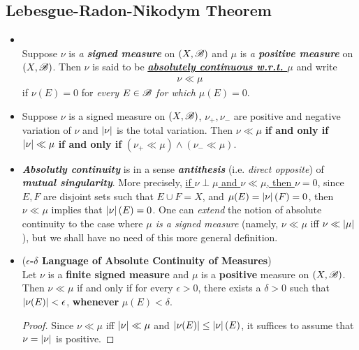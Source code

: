 \documentclass[11pt]{article}
\begin{document}
\subsection{Lebesgue-Radon-Nikodym Theorem}
\begin{itemize}
\item \begin{definition}\citep{folland2013real}\\
Suppose $\nu$ is \emph{a \textbf{signed measure}} on $(X,{\mathscr B})$ and $\mu$ is \emph{a \textbf{positive measure}} on $(X,{\mathscr B})$. Then $\nu$ is said to be \underline{\emph{\textbf{absolutely continuous w.r.t. $\mu$}}} and write
\begin{align*}
\nu \ll \mu 
\end{align*}
if $\nu(E)=0$ for \emph{every $E\in {\mathscr B}$ for which $\mu(E)=0$}. 
\end{definition}

\item
\begin{proposition}
Suppose $\nu$ is a signed measure on $(X,{\mathscr B})$,  $ \nu_{+}, \nu_{-}$ are positive and negative variation of $\nu$ and $\left\lvert \nu \right\rvert$ is the total variation. Then 
$\nu \ll \mu $ \textbf{if and only if} $\left\lvert \nu \right\rvert \ll \mu$ \textbf{if and only if} $(\nu_{+} \ll  \mu) \wedge (\nu_{-} \ll  \mu)$.
\end{proposition}

\item \begin{remark}
\emph{\textbf{Absolutly continuity}} is in a sense \emph{\textbf{antithesis}} (i.e. \emph{direct opposite}) of \emph{\textbf{mutual singularity}}. More precisely, 
\underline{if $\nu \perp \mu$ and $\nu \ll \mu$, then $\nu = 0$}, since $E, F$ are disjoint sets such that $E\cup F= X$, and $\mu(E)= \left\lvert \nu \right\rvert(F)= 0$, then $\nu \ll \mu$ implies that $\left\lvert \nu \right\rvert(E)= 0$. One can \emph{extend} the notion of absolute continuity to the case where \emph{$\mu$ is a signed measure} (namely, $\nu \ll \mu$ iff $\nu \ll \left\lvert \mu \right\rvert$), but we shall have no need of this more general definition.
 \end{remark}
 
 \item \begin{theorem} (\textbf{$\epsilon$-$\delta$ Language of Absolute Continuity of Measures})\\
Let $\nu$ is a \textbf{finite signed measure} and $\mu$ is a \textbf{positive} measure on $(X,{\mathscr B})$. Then $\nu \ll \mu$ if and only if for every $\epsilon>0$, there exists a $\delta>0$ such that $\left\lvert \nu(E) \right\rvert<\epsilon$, \textbf{whenever} $\mu(E)< \delta$.
\end{theorem}
\begin{proof}
Since $\nu \ll \mu$ iff $\left\lvert \nu \right\rvert \ll \mu$ and $\left\lvert \nu(E) \right\rvert\le \left\lvert \nu \right\rvert(E)$, it suffices to assume that $\nu= \left\lvert \nu \right\rvert$ is positive. 


\end{proof}
\end{itemize}
\end{document}
